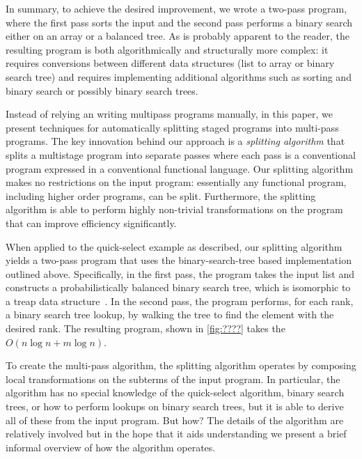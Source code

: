 \begin{abstrsyn}
In summary, to achieve the desired improvement, we wrote a two-pass
program, where the first pass sorts the input and the second pass
performs a binary search either on an array or a balanced tree. As is
probably apparent to the reader, the resulting program is both
algorithmically and structurally more complex: it requires conversions
between different data structures (list to array or binary search
tree) and requires implementing additional algorithms such as sorting
and binary search or possibly binary search trees.  



Instead of relying an writing multipass programs manually, in this
paper, we present techniques for automatically splitting staged
programs into multi-pass programs.  The key innovation behind our
approach is a {\em splitting algorithm} that splits a multistage
program into separate passes where each pass is a conventional program
expressed in a conventional functional language.  Our splitting
algorithm makes no restrictions on the input program: essentially any
functional program, including higher order programs, can be split.
Furthermore, the splitting algorithm is able to perform highly
non-trivial transformations on the program that can improve efficiency
significantly. 

When applied to the quick-select example as described, our splitting
algorithm yields a two-pass program that uses the binary-search-tree
based implementation outlined above.  Specifically, in the first pass,
the program takes the input list and constructs a probabilistically
balanced binary search tree, which is isomorphic to a treap data
structure~\cite{treaps}.  In the second pass, the program performs,
for each rank, a binary search tree lookup, by walking the tree to
find the element with the desired rank.  The resulting program, shown
in \ref{fig:????}  takes the $O(n\log{n} + m\log{n})$.

To create the multi-pass algorithm, the splitting algorithm operates
by composing local transformations on the subterms of the input
program.  In particular, the algorithm has no special knowledge of the
quick-select algorithm, binary search trees, or how to perform lookups
on binary search trees, but it is able to derive all of these from the
input program.  But how?
%
The details of the algorithm are relatively involved but in the hope
that it aids understanding we present a brief informal overview of how
the algorithm operates.  
%
%



\end{abstrsyn}
